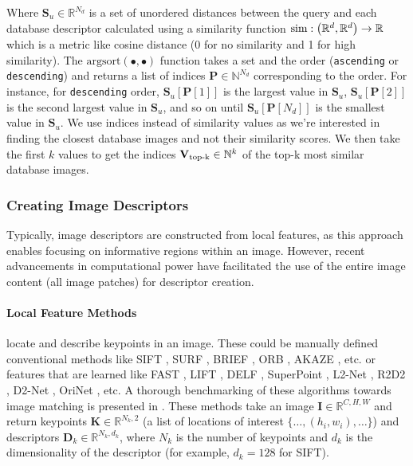 Where $\mathbf{S}_{u} \in \mathbb{R}^{N_d}$ is a set of unordered
distances between the query and each database descriptor calculated
using a similarity function $\textup{sim}: \left ( \mathbb{R}^d,
\mathbb{R}^d  \right ) \rightarrow \mathbb{R}$ which is a metric like
cosine distance (0 for no similarity and 1 for high similarity). The
$\textrm{argsort}(\bullet, \bullet)$ function takes a set and the
order (\texttt{ascending} or \texttt{descending}) and returns a list
of indices $\mathbf{P} \in \mathbb{N}^{N_d}$ corresponding to the
order. For instance, for \texttt{descending} order,
$\mathbf{S}_u[\mathbf{P}[1]]$ is the largest value in $\mathbf{S}_u$,
$\mathbf{S}_u[\mathbf{P}[2]]$ is the second largest value in
$\mathbf{S}_u$, and so on until $\mathbf{S}_u[\mathbf{P}[N_d]]$ is the
smallest value in $\mathbf{S}_u$. We use indices instead of similarity
values as we're interested in finding the closest database images and
not their similarity scores. We then take the first $k$ values to get
the indices $\mathbf{V}_{\textup{top-k}} \in \mathbb{N}^k$ of the
top-k most similar database images.

\subsubsection{Creating Image Descriptors}

Typically, image descriptors are constructed from local features, as
this approach enables focusing on informative regions within an image.
However, recent advancements in computational power have facilitated
the use of the entire image content (all image patches) for descriptor
creation.

\paragraph{Local Feature Methods} locate and describe keypoints in an
image. These could be manually defined conventional methods like SIFT
\cite{Lowe2004DistinctiveIF}, SURF \cite{Bay2006SURFSU}, BRIEF
\cite{Calonder2010BRIEFBR}, ORB \cite{Rublee2011ORBAE}, AKAZE
\cite{Alcantarilla2013FastED, Alcantarilla2012KAZEF}, etc. or features
that are learned like FAST \cite{Rosten2006MachineLF,
Rosten2008FasterAB}, LIFT \cite{Yi2016LIFTLI}, DELF
\cite{Noh2016LargeScaleIR}, SuperPoint \cite{DeTone2017SuperPointSI},
L2-Net \cite{Tian2017L2NetDL}, R2D2 \cite{Revaud2019R2D2RA}, D2-Net
\cite{Dusmanu2019D2NetAT}, OriNet \cite{Laguna2019KeyNetKD,
Mishkin2017RepeatabilityIN, Mishchuk2017WorkingHT}, etc. A thorough
benchmarking of these algorithms towards image matching is presented
in \cite{Jin2020ImageMA}. These methods take an image $\mathbf{I} \in
\mathbb{R}^{C, H, W}$ and return keypoints $\mathbf{K} \in
\mathbb{R}^{N_k, 2}$ (a list of locations of interest $\{\dots,(h_i,
w_i),\dots\}$) and descriptors $\mathbf{D}_{k} \in \mathbb{R}^{N_k,
d_k}$, where $N_k$ is the number of keypoints and $d_k$ is the
dimensionality of the descriptor (for example, $d_k = 128$ for SIFT).


